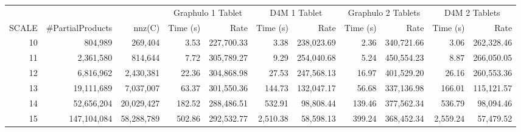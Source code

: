 \documentclass[conference]{IEEEtran}
\begin{document}
\begin{table*}[tb]                                                                                            
\centering                                                                                                           
\begin{tabular}{|r|r|r|r|r|r|r|r|r|r|r|}                                                                                  
\hline                                                                                                                   
 & & & \multicolumn{2}{|c|}{Graphulo 1 Tablet} & \multicolumn{2}{|c|}{D4M 1 Tablet} & \multicolumn{2}{|c|}{Graphulo 2 Tablets} & \multicolumn{2}{|c|}{D4M 2 Tablets} \\
SCALE & \#PartialProducts & nnz(C) & Time (s) & Rate & Time (s) & Rate & Time (s) & Rate & Time (s) & Rate \\             
\hline                                                                                                                    
10 & 804,989 & 269,404 & 3.53 & 227,700.33 & 3.38 & 238,023.69 & 2.36 & 340,721.66 & 3.06 & 262,328.46 \\                 
\hline                                                                                                                    
11 & 2,361,580 & 814,644 & 7.72 & 305,789.27 & 9.29 & 254,040.68 & 5.24 & 450,554.23 & 8.87 & 266,050.05 \\               
\hline                                                                                                                    
12 & 6,816,962 & 2,430,381 & 22.36 & 304,868.98 & 27.53 & 247,568.13 & 16.97 & 401,529.20 & 26.16 & 260,553.36 \\         
\hline                                                                                                                    
13 & 19,111,689 & 7,037,007 & 63.37 & 301,550.36 & 144.73 & 132,047.17 & 56.68 & 337,136.98 & 166.01 & 115,121.57 \\      
\hline                                                                                                                    
14 & 52,656,204 & 20,029,427 & 182.52 & 288,486.51 & 532.91 & 98,808.44 & 139.46 & 377,562.34 & 536.79 & 98,094.46 \\     
\hline                                                                                                                    
15 & 147,104,084 & 58,288,789 & 502.86 & 292,532.77 & 2,510.38 & 58,598.13 & 399.24 & 368,452.34 & 2,559.24 & 57,479.52 \\

\end{tabular}
\end{table*}
\end{document}
